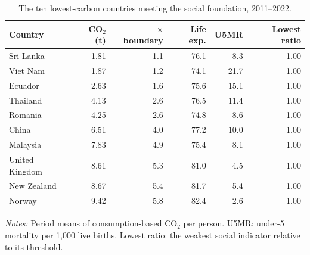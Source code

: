 \begin{table}[tbp]
\centering
\small
\caption{The ten lowest-carbon countries meeting the social foundation, 2011–2022.}
\label{tab:frontier}
\begin{threeparttable}
\begin{tabular}{lrrrrr}
\toprule
Country & CO$_2$ (t) & $\times$ boundary & Life exp. & U5MR & Lowest ratio \\
\midrule
Sri Lanka & 1.81 & 1.1 & 76.1 & 8.3 & 1.00 \\
Viet Nam & 1.87 & 1.2 & 74.1 & 21.7 & 1.00 \\
Ecuador & 2.63 & 1.6 & 75.6 & 15.1 & 1.00 \\
Thailand & 4.13 & 2.6 & 76.5 & 11.4 & 1.00 \\
Romania & 4.25 & 2.6 & 74.8 & 8.6 & 1.00 \\
China & 6.51 & 4.0 & 77.2 & 10.0 & 1.00 \\
Malaysia & 7.83 & 4.9 & 75.4 & 8.1 & 1.00 \\
United Kingdom & 8.61 & 5.3 & 81.0 & 4.5 & 1.00 \\
New Zealand & 8.67 & 5.4 & 81.7 & 5.4 & 1.00 \\
Norway & 9.42 & 5.8 & 82.4 & 2.6 & 1.00 \\
\bottomrule
\end{tabular}
\begin{tablenotes}[flushleft]
\footnotesize
\item \textit{Notes:} Period means of consumption-based CO$_2$ per person. U5MR: under-5 mortality per 1,000 live births. Lowest ratio: the weakest social indicator relative to its threshold.
\end{tablenotes}
\end{threeparttable}
\end{table}
